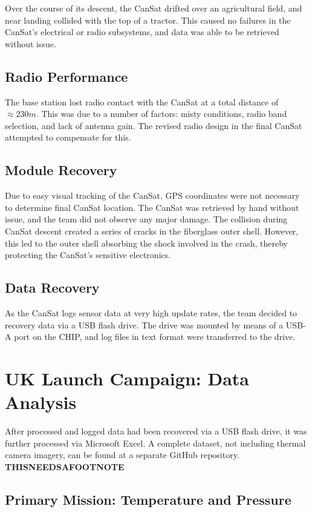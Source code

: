 \documentclass[]{report}
\begin{document}
	Over the course of its descent, the CanSat drifted over an agricultural field, and near landing collided with the top of a tractor. This caused no failures in the CanSat's electrical or radio subsystems, and data was able to be retrieved without issue.
	
	\subsection{Radio Performance}
	The base station lost radio contact with the CanSat at a total distance of $\approx230m$. This was due to a number of factors: misty conditions, radio band selection, and lack of antenna gain. The revised radio design in the final CanSat attempted to compensate for this.
	
	\subsection{Module Recovery}
	Due to easy visual tracking of the CanSat, GPS coordinates were not necessary to determine final CanSat location. The CanSat was retrieved by hand without issue, and the team did not observe any major damage. The collision during CanSat descent created a series of cracks in the fiberglass outer shell. However, this led to the outer shell absorbing the shock involved in the crash, thereby protecting the CanSat's sensitive electronics.
	
	\subsection{Data Recovery}
	As the CanSat logs sensor data at very high update rates, the team decided to recovery data via a USB flash drive. The drive was mounted by means of a USB-A port on the CHIP, and log files in text format were transferred to the drive.
	
	
	\section{UK Launch Campaign: Data Analysis}
	After processed and logged data had been recovered via a USB flash drive, it was further processed via Microsoft Excel. A complete dataset, not including thermal camera imagery, can be found at a separate GitHub repository. \textbf{THISNEEDSAFOOTNOTE}
	
	\subsection{Primary Mission: Temperature and Pressure}
	
\end{document}
